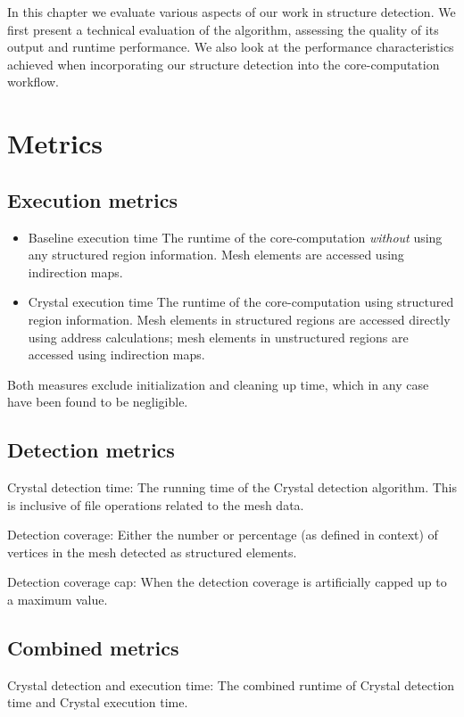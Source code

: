 In this chapter we evaluate various aspects of our work in structure detection.
We first present a technical evaluation of the algorithm, assessing the quality of its output and runtime performance. We also look at the performance characteristics achieved when incorporating our structure detection into the core-computation workflow.


\section{Metrics}
\subsection{Execution metrics}
\begin{itemize}
\item Baseline execution time
The runtime of the core-computation \emph{without} using any structured region information. Mesh elements are accessed using indirection maps.

\item Crystal execution time
The runtime of the core-computation using structured region information. Mesh elements in structured regions are accessed directly using address calculations; mesh elements in unstructured regions are accessed using indirection maps.
\end{itemize}
Both measures exclude initialization and cleaning up time, which in any case have been found to be negligible.

\subsection{Detection metrics}

Crystal detection time:
The running time of the Crystal detection algorithm. This is inclusive of file operations related to the mesh data.

Detection coverage:
Either the number or percentage (as defined in context) of vertices in the mesh detected as structured elements.

Detection coverage cap:
When the detection coverage is artificially capped up to a maximum value.

\subsection{Combined metrics}
Crystal detection and execution time:
The combined runtime of Crystal detection time and Crystal execution time.

